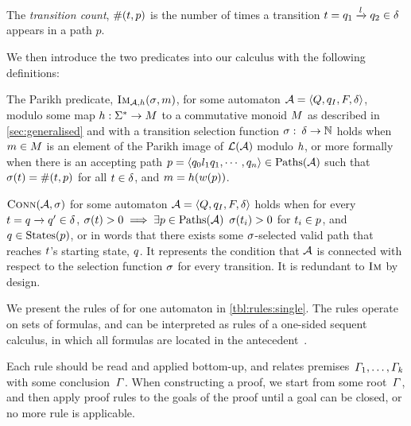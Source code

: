 \begin{definition}
 The \textit{transition count}, $\operatorname{\#}(t, p)$ is the
 number of times a transition $t =
 q_1 \xrightarrow{l} q_2 \in \delta$ appears in a path
 $p$.
\end{definition}

We then introduce the two predicates into our calculus with the following
definitions:

\begin{definition}\label{def:single-image}
  The Parikh predicate, $\operatorname{\textsc{Im}}_{\mathcal{A}, h}(\operatorname{\sigma}, m)$, for some automaton
  $\mathcal{A} = \left\langle Q, q_I, F, \delta\right\rangle$, modulo some map $h : \Sigma^* \to M$ to a
  commutative monoid $M$ as described in \cref{sec:generalised}
  and with a transition selection function
  $\operatorname{\sigma}:\: \delta \to \mathbb{N}$ holds when
  $m \in M$ is an element of the Parikh image of
  $\operatorname{\mathcal{L}}(\mathcal{A})$
  modulo $h$, or more formally when there is an accepting path
  $p = \left\langle q_0 l_1 q_1 , \cdots , q_n\right\rangle \in \operatorname{Paths}(\mathcal{A})$ such
  that $\operatorname{\sigma}(t) = \operatorname{\#}(t, p)$
  for all $t \in \delta$, and $m = h(w(p))$.
\end{definition}

\begin{definition}\label{def:connected} $\operatorname{\textsc{Conn}}(\mathcal{A}, \operatorname{\sigma})$ for
  some automaton $\mathcal{A} = \left\langle Q, q_I, F, \delta\right\rangle$ holds when for every
  $t = q \xrightarrow{} q' \in \delta$,
  $\operatorname{\sigma}(t) > 0 \implies \exists p \in \operatorname{Paths}(\mathcal{A})$
  $\operatorname{\sigma}(t_i) > 0$ for $t_i \in p$, and $q \in
  \operatorname{States}(p)$, or in words that there exists some $\operatorname{\sigma}$-selected valid
  path that reaches $t$'s starting state, $q$. It represents the
  condition that $\mathcal{A}$ is connected with respect to the selection
  function $\operatorname{\sigma}$ for every transition. It is redundant to $\operatorname{\textsc{Im}}$ by
  design.
\end{definition}

We present the rules of \Calculus{} for one automaton in
\cref{tbl:rules:single}. The rules operate on sets of formulas, and
can be interpreted as rules of a one-sided sequent calculus, in
which all formulas are located in the antecedent~\cite{Fitting96a}.

Each rule should be read and applied bottom-up, and relates
premises~$\varGamma_1, \ldots, \varGamma_k$ with some
conclusion~$\varGamma$. When constructing a proof, we start from some
root~$\varGamma$, and then apply proof rules to the goals of the proof until a
goal can be closed, or no more rule is applicable.

